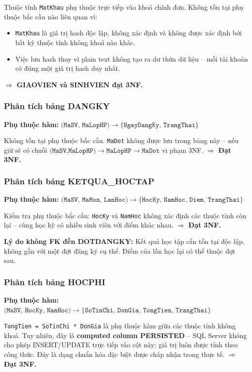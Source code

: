 \documentclass[13pt, a4paper]{article}
\begin{document}
\noindent Thuộc tính \texttt{MatKhau} phụ thuộc trực tiếp vào khoá chính đơn. Không tồn tại phụ thuộc bắc cầu nào liên quan vì:
\begin{itemize}[leftmargin=1.5cm]
  \item \texttt{MatKhau} là giá trị hash độc lập, không xác định và không được xác định bởi bất kỳ thuộc tính không khoá nào khác.
  \item Việc lưu hash thay vì plain text không tạo ra dư thừa dữ liệu -- mỗi tài khoản có đúng một giá trị hash duy nhất.
\end{itemize}
$\Rightarrow$ \textbf{GIAOVIEN và SINHVIEN đạt 3NF.}

\subsubsection{Phân tích bảng DANGKY}
\textbf{Phụ thuộc hàm:} $\texttt{(MaSV, MaLopHP)} \to \{\texttt{NgayDangKy, TrangThai}\}$

\noindent Không tồn tại phụ thuộc bắc cầu. \texttt{MaDot} không được lưu trong bảng này -- nếu giữ sẽ có chuỗi $\texttt{(MaSV,MaLopHP)} \to \texttt{MaLopHP} \to \texttt{MaDot}$ vi phạm 3NF. $\Rightarrow$ \textbf{Đạt 3NF.}

\subsubsection{Phân tích bảng KETQUA\_HOCTAP}
\textbf{Phụ thuộc hàm:} $\texttt{(MaSV, MaMon, LanHoc)} \to \{\texttt{HocKy, NamHoc, Diem, TrangThai}\}$

\noindent Kiểm tra phụ thuộc bắc cầu: \texttt{HocKy} và \texttt{NamHoc} không xác định các thuộc tính còn lại -- cùng học kỳ có nhiều sinh viên với điểm khác nhau. $\Rightarrow$ \textbf{Đạt 3NF.}

\noindent \textbf{Lý do không FK đến DOTDANGKY:} Kết quả học tập cần tồn tại độc lập, không gắn với một đợt đăng ký cụ thể. Điểm của lần học lại có thể thuộc đợt sau.

\subsubsection{Phân tích bảng HOCPHI}
\textbf{Phụ thuộc hàm:} $\texttt{(MaSV, HocKy, NamHoc)} \to \{\texttt{SoTinChi, DonGia, TongTien, TrangThai}\}$

\noindent \texttt{TongTien = SoTinChi * DonGia} là phụ thuộc hàm giữa các thuộc tính không khoá. Tuy nhiên, đây là \textbf{computed column PERSISTED} -- SQL Server không cho phép INSERT/UPDATE trực tiếp vào cột này; giá trị luôn được tính theo công thức. Đây là dạng chuẩn hóa đặc biệt được chấp nhận trong thực tế. $\Rightarrow$ \textbf{Đạt 3NF.}
\end{document}

